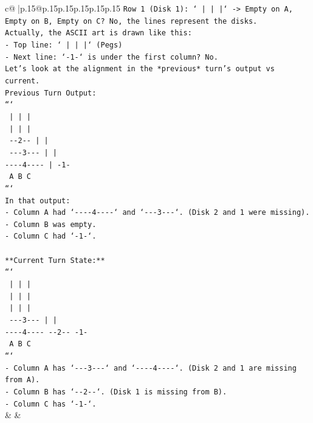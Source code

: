 \documentclass{article}
\begin{document}
{\begin{supertabular}{c@{$\;$}|p{.15\linewidth}@{}p{.15\linewidth}p{.15\linewidth}p{.15\linewidth}p{.15\linewidth}p{.15\linewidth}}
{{{\texttt{Row 1 (Disk 1): `    |         |         |` {-}> Empty on A, Empty on B, Empty on C? No, the lines represent the disks.} \\
\texttt{Actually, the ASCII art is drawn like this:} \\
\texttt{{-} Top line: `    |         |         |` (Pegs)} \\
\texttt{{-} Next line: `{-}1{-}` is under the first column? No.} \\
\texttt{Let's look at the alignment in the *previous* turn's output vs current.} \\
\texttt{Previous Turn Output:} \\
\texttt{```} \\
\texttt{    |         |         |    } \\
\texttt{    |         |         |    } \\
\texttt{  {-}{-}2{-}{-}       |         |    } \\
\texttt{ {-}{-}{-}3{-}{-}{-}      |         |    } \\
\texttt{{-}{-}{-}{-}4{-}{-}{-}{-}     |        {-}1{-}   } \\
\texttt{    A         B         C    } \\
\texttt{```} \\
\texttt{In that output:} \\
\texttt{{-} Column A had `{-}{-}{-}{-}4{-}{-}{-}{-}` and `{-}{-}{-}3{-}{-}{-}`. (Disk 2 and 1 were missing).} \\
\texttt{{-} Column B was empty.} \\
\texttt{{-} Column C had `{-}1{-}`.} \\
\\ 
\texttt{**Current Turn State:**} \\
\texttt{```} \\
\texttt{    |         |         |    } \\
\texttt{    |         |         |    } \\
\texttt{    |         |         |    } \\
\texttt{ {-}{-}{-}3{-}{-}{-}      |         |    } \\
\texttt{{-}{-}{-}{-}4{-}{-}{-}{-}   {-}{-}2{-}{-}      {-}1{-}   } \\
\texttt{    A         B         C    } \\
\texttt{```} \\
\texttt{{-} Column A has `{-}{-}{-}3{-}{-}{-}` and `{-}{-}{-}{-}4{-}{-}{-}{-}`. (Disk 2 and 1 are missing from A).} \\
\texttt{{-} Column B has `{-}{-}2{-}{-}`. (Disk 1 is missing from B).} \\
\texttt{{-} Column C has `{-}1{-}`.} \\
            }
        }
    }
    & & \\ \\


\end{supertabular}}
\end{document}
